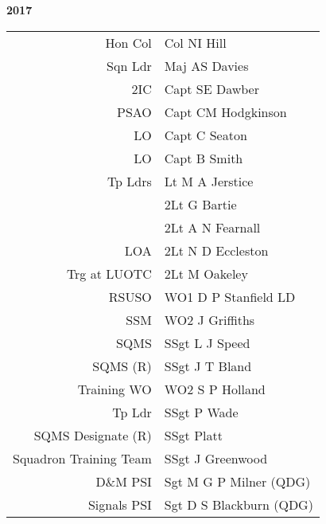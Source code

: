 \begin{center}
  \Huge
  \textbf{2017}
\end{center}

\begin{center}
  \small
  \begin{tabular}{rl}
    Hon Col & Col NI Hill \\
    Sqn Ldr & Maj AS Davies \\
    2IC & Capt SE Dawber \\
    PSAO & Capt CM Hodgkinson \\
    LO & Capt C Seaton \\
    LO & Capt B Smith \\
    Tp Ldrs & Lt M A Jerstice \\
     & 2Lt G Bartie \\
     & 2Lt A N Fearnall \\
    LOA & 2Lt N D Eccleston \\
    Trg at LUOTC & 2Lt M Oakeley \\
    RSUSO & WO1 D P Stanfield LD \\
    SSM & WO2 J Griffiths \\
    SQMS & SSgt L J Speed \\
    SQMS (R) & SSgt J T Bland \\
    Training WO & WO2 S P Holland \\
    Tp Ldr & SSgt P Wade \\
    SQMS Designate (R) & SSgt Platt \\
    Squadron Training Team & SSgt J Greenwood \\
    D\&M PSI & Sgt M G P Milner (QDG) \\
    Signals PSI & Sgt D S Blackburn (QDG) \\
  \end{tabular}
\end{center}

